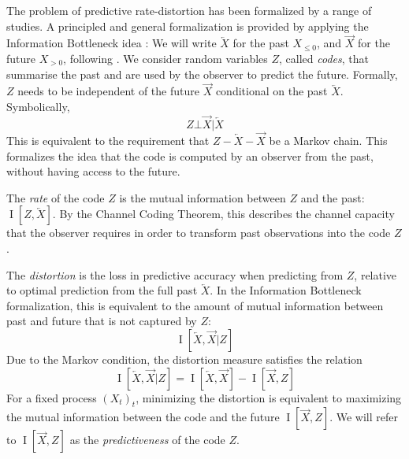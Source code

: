 \documentclass[11pt,letterpaper]{article}
\begin{document}
The problem of predictive rate-distortion has been formalized by a range of studies.
A principled and general formalization is provided by applying the Information Bottleneck idea \citep{tishby-information-1999, still-optimal-2010, marzen-predictive-2016}:
We will write $\overleftarrow{X}$ for the past $X_{\leq 0}$, and $\overrightarrow{X}$ for the future $X_{> 0}$, following \cite{marzen-predictive-2016}.
We consider random variables $Z$, called \emph{codes}, that summarise the past and are used by the observer to predict the future.
Formally, $Z$ needs to be independent of the future $\overrightarrow{X}$ conditional on the past $\overleftarrow{X}$. Symbolically, 
\begin{equation}\label{eq:markov}
	Z \bot \overrightarrow{X} | \overleftarrow{X}
\end{equation}
This is equivalent to the requirement that $Z - \overleftarrow{X} - \overrightarrow{X}$ be a Markov chain.
This formalizes the idea that the code is computed by an observer from the past, without having access to the future.



The \emph{rate} of the code $Z$ is the mutual information between $Z$ and the past: $\operatorname{I}[Z, \overleftarrow{X}]$.
By the Channel Coding Theorem, this describes the channel capacity that the observer requires in order to transform past observations into the code $Z$.

The \emph{distortion} is the loss in predictive accuracy when predicting from $Z$, relative to optimal prediction from the full past $\overleftarrow{X}$.
In the Information Bottleneck formalization, this
is equivalent to the amount of mutual information between past and future that is not captured by $Z$:
\begin{equation}
	\operatorname{I}[\overleftarrow{X}, \overrightarrow{X}|Z]
\end{equation}
Due to the Markov condition, the distortion measure satisfies the relation
\begin{equation}
	\operatorname{I}[\overleftarrow{X}, \overrightarrow{X}|Z] = \operatorname{I}[\overleftarrow{X}, \overrightarrow{X}] - \operatorname{I}[\overrightarrow{X}, Z]
\end{equation}
For a fixed process $(X_t)_t$, minimizing the distortion is equivalent to maximizing the mutual information between the code and the future $\operatorname{I}[\overrightarrow{X}, Z]$. We will refer to $\operatorname{I}[\overrightarrow{X}, Z]$ as the \emph{predictiveness} of the code $Z$.
\end{document}

